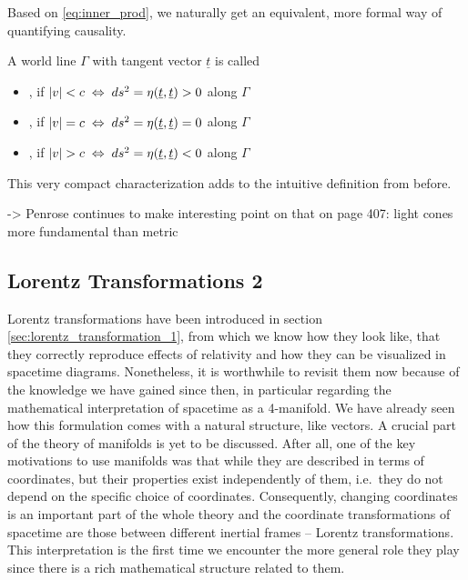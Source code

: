Based on \eqref{eq:inner_prod}, we naturally get an equivalent, more formal way of quantifying causality.
\begin{defi}
	A world line $\Gamma$ with tangent vector $\underline{t}$ is called
	\begin{itemize}
		\item {}, if $\abs{v} < c \; \Leftrightarrow \; ds^2 = \eta(\underline{t}, \underline{t}) > 0$ along $\Gamma$
		
		
		\item {}, if $\abs{v} = c \; \Leftrightarrow \; ds^2 = \eta(\underline{t}, \underline{t}) = 0$ along $\Gamma$
		
		
		\item {}, if $\abs{v} > c \; \Leftrightarrow \; ds^2 = \eta(\underline{t}, \underline{t}) < 0$ along $\Gamma$
	\end{itemize}
\end{defi}
This very compact characterization adds to the intuitive definition from before.


-> Penrose continues to make interesting point on that on page 407: light cones more fundamental than metric



		\subsection{Lorentz Transformations 2}\label{subsec:lorentz_transformation_2}
Lorentz transformations have been introduced in section \ref{sec:lorentz_transformation_1}, from which we know how they look like, that they correctly reproduce effects of relativity and how they can be visualized in spacetime diagrams. Nonetheless, it is worthwhile to revisit them now because of the knowledge we have gained since then, in particular regarding the mathematical interpretation of spacetime as a 4-manifold. We have already seen how this formulation comes with a natural structure, like vectors. A crucial part of the theory of manifolds is yet to be discussed. After all, one of the key motivations to use manifolds was that while they are described in terms of coordinates, but their properties exist independently of them, i.e.~they do not depend on the specific choice of coordinates. Consequently, changing coordinates is an important part of the whole theory and the coordinate transformations of spacetime are those between different inertial frames -- Lorentz transformations. This interpretation is the first time we encounter the more general role they play since there is a rich mathematical structure related to them.




